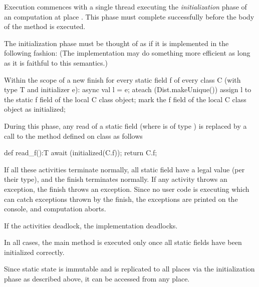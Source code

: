 Execution commences with a single thread executing the
\emph{initialization} phase of an \Xten{} computation at place . This
phase must complete successfully before the body of the  method is
executed.

The initialization phase must be thought of as if it is implemented in
the following fashion: (The implementation may do something more
efficient as long as it is faithful to this semantics.)

\begin{xten}
Within the scope of a new finish
for every static field f of every class C 
   (with type T and initializer e):
async {
  val l = e; 
  ateach (Dist.makeUnique()) {
     assign l to the static f field of 
         the local C class object;
     mark the f field of the local C 
         class object as initialized;
  }
}
\end{xten}

During this phase, any read of a static field  (where  is of type )
is replaced by a call to the method  defined on class 
as follows

\begin{xten}
def read_f():T {
   await (initialized(C.f));
   return C.f;
}
\end{xten}
 

If all these activities terminate normally, all static field have a
legal value (per their type), and the finish terminates normally. If
any activity throws an exception, the finish throws an
exception. Since no user code is executing which can catch exceptions
thrown by the finish, the exceptions are printed on the console, and
computation aborts.

If the activities deadlock, the implementation deadlocks.

In all cases, the main method is executed only once all static fields
have been initialized correctly.

Since static state is immutable and is replicated to all places via 
the initialization phase as described above, it can be accessed from
any place.
